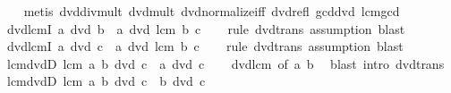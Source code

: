 \begin{isabellebody}
%
\isadelimproof
\ \ %
\endisadelimproof
%
\isatagproof
{}\isamarkupfalse%
\ {\isacharparenleft}{\kern0pt}metis\ dvd{\isacharunderscore}{\kern0pt}div{\isacharunderscore}{\kern0pt}mult\ dvd{\isacharunderscore}{\kern0pt}mult\ dvd{\isacharunderscore}{\kern0pt}normalize{\isacharunderscore}{\kern0pt}iff\ dvd{\isacharunderscore}{\kern0pt}refl\ gcd{\isacharunderscore}{\kern0pt}dvd{}\ lcm{\isacharunderscore}{\kern0pt}gcd{\isacharparenright}{\kern0pt}%
\endisatagproof
{\isafoldproof}%
%
\isadelimproof
\isanewline
%
\endisadelimproof
\isanewline
{}\isamarkupfalse%
\ dvd{\isacharunderscore}{\kern0pt}lcmI{}{\isacharcolon}{\kern0pt}\ {\isachardoublequoteopen}a\ dvd\ b\ {\isasymLongrightarrow}\ a\ dvd\ lcm\ b\ c{\isachardoublequoteclose}\isanewline
%
\isadelimproof
\ \ %
\endisadelimproof
%
\isatagproof
{}\isamarkupfalse%
\ {\isacharparenleft}{\kern0pt}rule\ dvd{\isacharunderscore}{\kern0pt}trans{\isacharparenright}{\kern0pt}\ {\isacharparenleft}{\kern0pt}assumption{\isacharcomma}{\kern0pt}\ blast{\isacharparenright}{\kern0pt}%
\endisatagproof
{\isafoldproof}%
%
\isadelimproof
\isanewline
%
\endisadelimproof
\isanewline
{}\isamarkupfalse%
\ dvd{\isacharunderscore}{\kern0pt}lcmI{}{\isacharcolon}{\kern0pt}\ {\isachardoublequoteopen}a\ dvd\ c\ {\isasymLongrightarrow}\ a\ dvd\ lcm\ b\ c{\isachardoublequoteclose}\isanewline
%
\isadelimproof
\ \ %
\endisadelimproof
%
\isatagproof
{}\isamarkupfalse%
\ {\isacharparenleft}{\kern0pt}rule\ dvd{\isacharunderscore}{\kern0pt}trans{\isacharparenright}{\kern0pt}\ {\isacharparenleft}{\kern0pt}assumption{\isacharcomma}{\kern0pt}\ blast{\isacharparenright}{\kern0pt}%
\endisatagproof
{\isafoldproof}%
%
\isadelimproof
\isanewline
%
\endisadelimproof
\isanewline
{}\isamarkupfalse%
\ lcm{\isacharunderscore}{\kern0pt}dvdD{}{\isacharcolon}{\kern0pt}\ {\isachardoublequoteopen}lcm\ a\ b\ dvd\ c\ {\isasymLongrightarrow}\ a\ dvd\ c{\isachardoublequoteclose}\isanewline
%
\isadelimproof
\ \ %
\endisadelimproof
%
\isatagproof
{}\isamarkupfalse%
\ dvd{\isacharunderscore}{\kern0pt}lcm{}\ {\isacharbrackleft}{\kern0pt}of\ a\ b{\isacharbrackright}{\kern0pt}\ \isamarkupfalse%
\ {\isacharparenleft}{\kern0pt}blast\ intro{\isacharcolon}{\kern0pt}\ dvd{\isacharunderscore}{\kern0pt}trans{\isacharparenright}{\kern0pt}%
\endisatagproof
{\isafoldproof}%
%
\isadelimproof
\isanewline
%
\endisadelimproof
\isanewline
{}\isamarkupfalse%
\ lcm{\isacharunderscore}{\kern0pt}dvdD{}{\isacharcolon}{\kern0pt}\ {\isachardoublequoteopen}lcm\ a\ b\ dvd\ c\ {\isasymLongrightarrow}\ b\ dvd\ c{\isachardoublequoteclose}\isanewline

\end{isabellebody}
